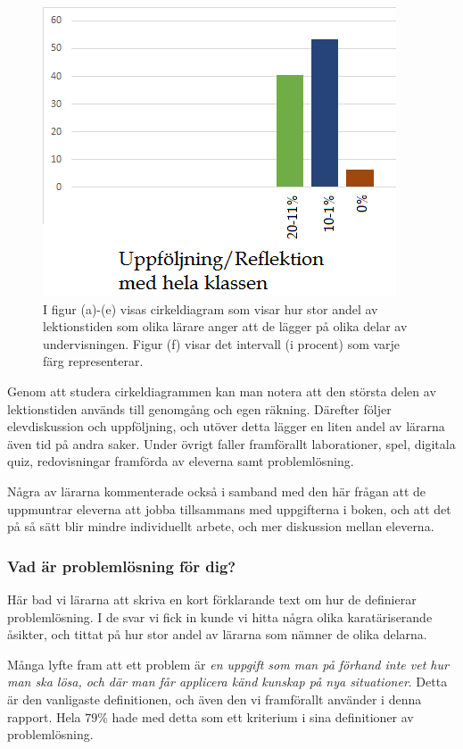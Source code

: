 \begin{figure}
    \includegraphics{Figures/Barcharts/uppfoljning.png}
    \caption{I figur (a)-(e) visas cirkeldiagram som visar hur stor andel av lektionstiden som olika lärare anger att de lägger på olika delar av undervisningen. Figur (f) visar det intervall (i procent) som varje färg representerar.}
    \label{fig:PC}
\end{figure}

\newpage

\textcolor{lila}{Genom att studera cirkeldiagrammen kan man notera att den största delen av lektionstiden används till genomgång och egen räkning. Därefter följer elevdiskussion och uppföljning, och utöver detta lägger en liten andel av lärarna även tid på andra saker. Under övrigt faller framförallt laborationer, spel, digitala quiz, redovisningar framförda av eleverna samt problemlösning.}

\textcolor{lila}{Några av lärarna kommenterade också i samband med den här frågan att de uppmuntrar eleverna att jobba tillsammans med uppgifterna i boken, och att det på så sätt blir mindre individuellt arbete, och mer diskussion mellan eleverna.}

\subsubsection{Vad är problemlösning för dig?}
\textcolor{lila}{Här bad vi lärarna att skriva en kort förklarande text om hur de definierar problemlösning. I de svar vi fick in kunde vi hitta några olika karatäriserande åsikter, och tittat på hur stor andel av lärarna som nämner de olika delarna.}

\textcolor{lila}{Många lyfte fram att ett problem är \textsl{en uppgift som man på förhand inte vet hur man ska lösa, och där man får applicera känd kunskap på nya situationer}. Detta är den vanligaste definitionen, och även den vi framförallt använder i denna rapport. Hela $79\%$ hade med detta som ett kriterium i sina definitioner av problemlösning.}


